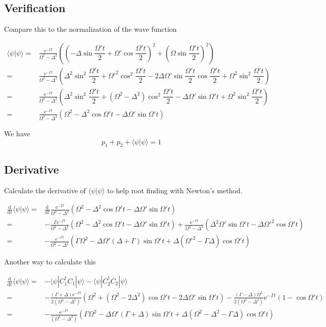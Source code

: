 \documentclass[10pt,fleqn]{article}
\newcommand{\ud}{\mathrm{d}}
\newcommand{\ue}{\mathrm{e}}
\newcommand{\eqar}[1]
{
  \begin{align*}
    #1
  \end{align*}
}
\newcommand{\paren}[1]{{\left({#1}\right)}}
\newcommand{\diff}[3][{}]{{\frac{\ud^{#1} {#2}}{\ud {#3}{}^{#1}}}}
\begin{document}
\subsection{Verification}
Compare this to the normalization of the wave function
\eqar{
  \langle\psi|\psi\rangle=&\frac{\ue^{-\Gamma t}}{\Omega^2-\Delta^2}\paren{
    \paren{-\Delta\sin\dfrac{\Omega't}{2}+\Omega'\cos\dfrac{\Omega't}{2}}^2+
    \paren{\Omega\sin\dfrac{\Omega't}{2}}^2
  }\\
  =&\frac{\ue^{-\Gamma t}}{\Omega^2-\Delta^2}\paren{
    \Delta^2\sin^2\dfrac{\Omega't}{2}+\Omega'^2\cos^2\dfrac{\Omega't}{2}
    -2\Delta\Omega'\sin\dfrac{\Omega't}{2}\cos\dfrac{\Omega't}{2}+
    \Omega^2\sin^2\dfrac{\Omega't}{2}
  }\\
  =&\frac{\ue^{-\Gamma t}}{\Omega^2-\Delta^2}\paren{
    \Delta^2\sin^2\dfrac{\Omega't}{2}+\paren{\Omega^2-\Delta^2}\cos^2\dfrac{\Omega't}{2}
    -\Delta\Omega'\sin\Omega't+
    \Omega^2\sin^2\dfrac{\Omega't}{2}
  }\\
  =&\frac{\ue^{-\Gamma t}}{\Omega^2-\Delta^2}\paren{
    \Omega^2-\Delta^2\cos\Omega't-\Delta\Omega'\sin\Omega't
  }
}
We have
\[p_1 + p_2+\langle\psi|\psi\rangle=1\]
\subsection{Derivative}
Calculate the derivative of $\langle\psi|\psi\rangle$ to help root finding with Newton's method.
\eqar{
  \diff{}{t}\langle\psi|\psi\rangle=&\diff{}{t}\frac{\ue^{-\Gamma t}}{\Omega^2-\Delta^2}\paren{
    \Omega^2-\Delta^2\cos\Omega't-\Delta\Omega'\sin\Omega't
  }\\
  =&-\frac{\Gamma\ue^{-\Gamma t}}{\Omega^2-\Delta^2}\paren{
    \Omega^2-\Delta^2\cos\Omega't-\Delta\Omega'\sin\Omega't
  }+\frac{\ue^{-\Gamma t}}{\Omega^2-\Delta^2}\paren{
    \Delta^2\Omega'\sin\Omega't-\Delta\Omega'^2\cos\Omega't
  }\\
  =&-\frac{\ue^{-\Gamma t}}{\Omega^2-\Delta^2}\paren{
    \Gamma\Omega^2
    -\Delta\Omega'\paren{\Delta+\Gamma}\sin\Omega't
    +\Delta\paren{\Omega'^2-\Gamma\Delta}\cos\Omega't
  }
}
Another way to calculate this
\eqar{
  \diff{}{t}\langle\psi|\psi\rangle=&-\langle\psi|C_1^\dagger C_1|\psi\rangle-\langle\psi|C_2^\dagger C_2|\psi\rangle\\
  =&-\frac{\paren{\Gamma+\Delta}\ue^{-\Gamma t}}{2\paren{\Omega^2-\Delta^2}}\paren{
    \Omega^2+\paren{\Omega^2-2\Delta^2}\cos\Omega't-2\Delta\Omega'\sin\Omega't
  }-\frac{\paren{\Gamma-\Delta}\Omega^2}{2\paren{\Omega^2-\Delta^2}}\ue^{-\Gamma t}\paren{1-\cos\Omega't}\\
  =&-\frac{\ue^{-\Gamma t}}{\paren{\Omega^2-\Delta^2}}\paren{
    \Gamma\Omega^2-\Delta\Omega'\paren{\Gamma+\Delta}\sin\Omega't+\Delta\paren{\Omega^2-\Delta^2-\Gamma\Delta}\cos\Omega't
  }
}
\end{document}
